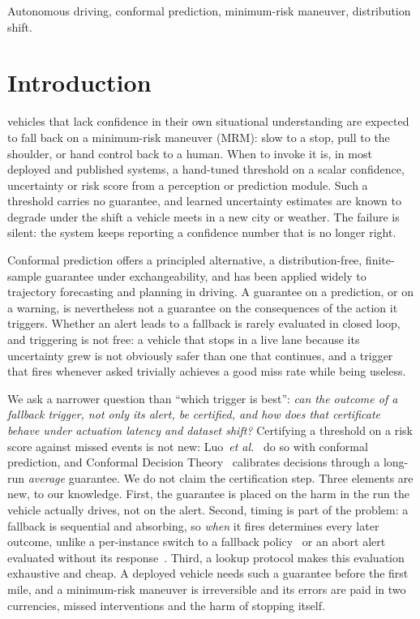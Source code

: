 \documentclass[lettersize,journal]{IEEEtran}
\begin{document}
\begin{IEEEkeywords}
Autonomous driving, conformal prediction, minimum-risk maneuver,
distribution shift.
\end{IEEEkeywords}

\section{Introduction}
 vehicles that lack confidence in their own
situational understanding are expected to fall back on a minimum-risk
maneuver (MRM): slow to a stop, pull to the shoulder, or hand control
back to a human. When to invoke it is, in most deployed and published
systems, a hand-tuned threshold on a scalar confidence, uncertainty or risk
score from a perception or prediction module. Such a threshold carries
no guarantee, and learned uncertainty estimates are known to degrade
under the shift a vehicle meets in a new city or weather. The failure
is silent: the system keeps reporting a confidence number that is no
longer right.

Conformal prediction offers a principled alternative, a
distribution-free, finite-sample guarantee under exchangeability, and
has been applied widely to trajectory forecasting and planning in
driving. A guarantee on a prediction, or on a warning, is nevertheless
not a guarantee on the consequences of the action it triggers. Whether
an alert leads to a fallback is rarely evaluated in closed loop, and
triggering is not free: a vehicle that stops in a live lane because its
uncertainty grew is not obviously safer than one that continues, and a
trigger that fires whenever asked trivially achieves a good miss rate
while being useless.

We ask a narrower question than ``which trigger is best'':
\emph{can the outcome of a fallback trigger, not only its alert, be
certified, and how does that certificate behave under actuation latency
and dataset shift?}
Certifying a threshold on a risk score against missed events is not new:
Luo~\emph{et al.}~\cite{luo2022} do so with conformal prediction, and
Conformal Decision Theory~\cite{cdt2024} calibrates decisions through a
long-run \emph{average} guarantee. We do not claim the certification step.
Three elements are new, to our knowledge. First, the guarantee is placed on
the harm in the run the vehicle actually drives, not on the alert. Second,
timing is part of the problem: a fallback is sequential and absorbing, so
\emph{when} it fires determines every later outcome, unlike a per-instance
switch to a fallback policy~\cite{joshi2026post} or an abort alert evaluated
without its response~\cite{feldman2025}. Third, a lookup protocol makes this
evaluation exhaustive and cheap. A deployed vehicle needs such a guarantee
before the first mile, and a minimum-risk maneuver is irreversible and its
errors are paid in two currencies, missed interventions and the harm of
stopping itself.
\end{document}
